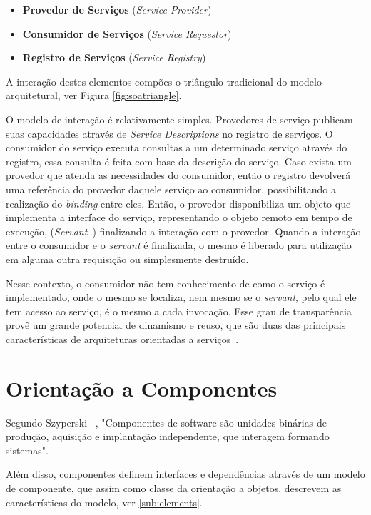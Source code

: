 \begin{itemize}
 \item \textbf{Provedor de Serviços} (\textit{Service Provider})
 \item \textbf{Consumidor de Serviços} (\textit{Service Requestor})
 \item \textbf{Registro de Serviços} (\textit{Service Registry})
\end{itemize}

A interação destes elementos compões o triângulo tradicional do modelo arquitetural, ver Figura \ref{fig:soatriangle}. 

O modelo de interação é relativamente simples. Provedores de serviço publicam suas capacidades através de \textit{Service Descriptions} no registro de serviços.
O consumidor do serviço executa consultas a um determinado serviço através do registro, essa consulta é feita com base da descrição do serviço. Caso exista um provedor que atenda as necessidades do consumidor, então o registro devolverá uma referência do provedor daquele serviço ao consumidor, possibilitando a realização do \textit{binding} entre eles. Então, o provedor disponibiliza um objeto que implementa a interface do serviço, representando o objeto remoto em tempo de execução, (\textit{Servant}~\cite{volter2005remoting}) finalizando a interação com o provedor. Quando a interação entre o consumidor e o \textit{servant} é finalizada, o mesmo é liberado para utilização em alguma outra requisição ou simplesmente destruído.

Nesse contexto, o consumidor não tem conhecimento de como o serviço é implementado, onde o mesmo se localiza, nem mesmo se o \textit{servant}, pelo qual ele tem acesso ao serviço, é o mesmo a cada invocação. Esse grau de transparência provê um grande potencial de dinamismo e reuso, que são duas das principais características de arquiteturas orientadas a serviços~\cite{davis2009open}.


\section{Orientação a Componentes}
Segundo Szyperski ~\cite{szyperski2002component}, "Componentes de software são unidades binárias de produção, aquisição e implantação independente, que interagem formando sistemas".

Além disso, componentes definem interfaces e dependências através de um modelo de componente, que assim como classe da orientação a objetos, descrevem as características do modelo, ver \ref{sub:elements}.

